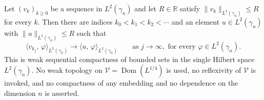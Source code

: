\begin{lemma}
Let $(v_k)_{k \geq 0}$ be a sequence in $L^2(\gamma_n)$ and let $R \in \mathbb{R}$
satisfy $\|v_k\|_{L^2(\gamma_n)} \leq R$ for every $k$.  Then there are indices
$k_0 < k_1 < k_2 < \cdots$ and an element $u \in L^2(\gamma_n)$ with
$\|u\|_{L^2(\gamma_n)} \leq R$ such that
\[
  \langle v_{k_j},\, \varphi\rangle_{L^2(\gamma_n)}
    \longrightarrow \langle u,\, \varphi\rangle_{L^2(\gamma_n)}
  \qquad\text{as } j \to \infty, \text{ for every } \varphi \in L^2(\gamma_n).
\]
This is weak sequential compactness of bounded sets in the single Hilbert space
$L^2(\gamma_n)$.  No weak topology on $\mathcal{V} = \operatorname{Dom}(L^{1/4})$
is used, no reflexivity of $\mathcal{V}$ is invoked, and no compactness of any
embedding and no dependence on the dimension $n$ is asserted.
\end{lemma}
